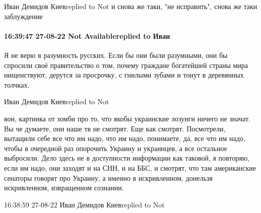 Иван Демидов Киевreplied to Not
и снова же таки, "не исправить", снова же таки заблуждение

\paragraph{16:39:47 27-08-22 Not Availablereplied to Иван}

Я не верю в разумность русских. Если бы они были разумными, они бы спросили
своё правительство о том, почему граждане богатейшей страны мира нищенствуют,
дерутся за просрочку, с гнилыми зубами и тонут в деревянных толчках.


Иван Демидов Киевreplied to Not

вон, картинка от зомби про то, что якобы украинские лозунги ничего не значат.
Вы че думаете, они наше тв не смотрят. Еще как смотрят. Посмотрели, вытащили
себе все что им надо, что им надо, понимаете, да, все что им надо, чтобы в
очередной раз опорочить Украину и украинцев, а все остальное выбросили. Дело
здесь не в доступности информации как таковой, я повторяю, если им надо, они
заходят и на СНН, и на ББС, и смотрят, что там американские сенаторы говорят
про Украину, а именно в искривленном, донельзя искривленном, извращенном
сознании.

16:38:59 27-08-22 Иван Демидов Киевreplied to Not

